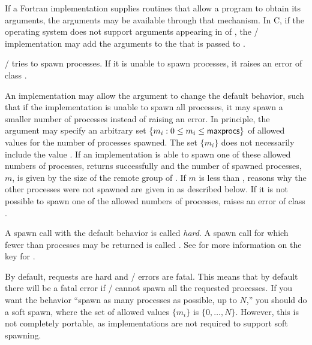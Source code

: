\begin{description}
If a Fortran implementation supplies
routines that allow a program to obtain its arguments, the
arguments may be available through that mechanism.
In C, if the operating system does not support
arguments appearing in  of ,
the \MPI/ implementation may add the
arguments to the  that is passed to .

\item[\mpiarg{maxprocs}:]
\MPI/ tries to spawn  processes.  If it is unable to
spawn  processes, it raises an error
of class .

An implementation may allow the  argument to change
the default behavior, such that if the implementation is
unable to spawn all  processes, it may
spawn a smaller number of processes instead of raising
an error. In principle, the 
argument may specify an arbitrary set $\{m_i: 0 \leq m_i \leq
\mpiarg{maxprocs}\}$ of allowed values for the number of
processes spawned. The set $\{m_i\}$ does not necessarily
include the value . If an implementation
is able to spawn one of these allowed numbers of processes,
 returns successfully
and the number of spawned processes, $m$,
is given by the size of the remote group of .
If $m$ is less than
, reasons why the other processes
were not spawned are given in 
as described below.  If it is
not possible to spawn one of the allowed numbers of processes,
 raises an
error of class .

A spawn call with the default behavior is called \emph{hard}.
A spawn call for which fewer than  processes may be
returned is called . See 
for
more information on the  key for .

\begin{users}
By default, requests are hard and \MPI/ errors are fatal. This means
that by default there will be a fatal error if \MPI/ cannot
spawn all the requested processes. If you want the behavior
``spawn as many processes as possible, up to $N$,'' you
should do a soft spawn, where the set of allowed values $\{m_i\}$
is $\{0, \ldots, N\}$. However, this is not completely portable,
as implementations are not required to support soft spawning.
\end{users}



\end{description}
